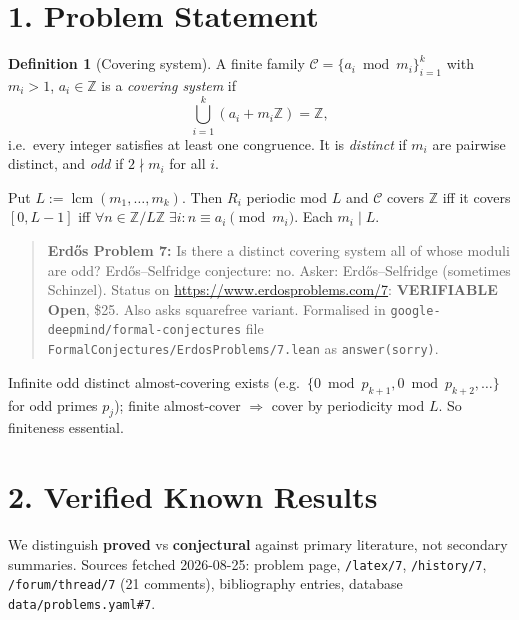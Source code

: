 \documentclass[11pt,a4paper]{article}
\theoremstyle{plain}
\theoremstyle{definition}
\newtheorem{definition}[theorem]{Definition}
\theoremstyle{remark}
\newcommand{\Z}{\mathbb{Z}}
\begin{document}
\tableofcontents
\newpage

\section{1. Problem Statement}

\begin{definition}[Covering system]
A finite family $\mathcal C=\{a_{i}\bmod m_{i}\}_{i=1}^{k}$ with $m_{i}>1$, $a_{i}\in\Z$ is a \emph{covering system} if
\[
\bigcup_{i=1}^{k}(a_{i}+m_{i}\Z)=\Z ,
\]
i.e.\ every integer satisfies at least one congruence. It is \emph{distinct} if $m_{i}$ are pairwise distinct, and \emph{odd} if $2\nmid m_{i}$ for all $i$.
\end{definition}

Put $L:=\operatorname{lcm}(m_{1},\dots,m_{k})$. Then $R_{i}$ periodic mod $L$ and $\mathcal C$ covers $\Z$ iff it covers $[0,L-1]$ iff $\forall n\in\Z/L\Z\;\exists i:n\equiv a_{i}\pmod{m_{i}}$. Each $m_{i}\mid L$.

\begin{quote}
\textbf{Erd\H{o}s Problem 7:} Is there a distinct covering system all of whose moduli are odd? Erd\H{o}s--Selfridge conjecture: no. Asker: Erd\H{o}s--Selfridge (sometimes Schinzel). Status on \url{https://www.erdosproblems.com/7}: \textbf{VERIFIABLE Open}, \$25. Also asks squarefree variant. Formalised in \texttt{google-deepmind/formal-conjectures} file \texttt{FormalConjectures/ErdosProblems/7.lean} as \texttt{answer(sorry)}.
\end{quote}

Infinite odd distinct almost-covering exists (e.g.\ $\{0\bmod p_{k+1},0\bmod p_{k+2},\dots\}$ for odd primes $p_{j}$); finite almost-cover $\Rightarrow$ cover by periodicity mod $L$. So finiteness essential.

\section{2. Verified Known Results}

We distinguish \textbf{proved} vs \textbf{conjectural} against primary literature, not secondary summaries. Sources fetched 2026-08-25: problem page, \texttt{/latex/7}, \texttt{/history/7}, \texttt{/forum/thread/7} (21 comments), bibliography entries, database \texttt{data/problems.yaml\#7}.
\end{document}
